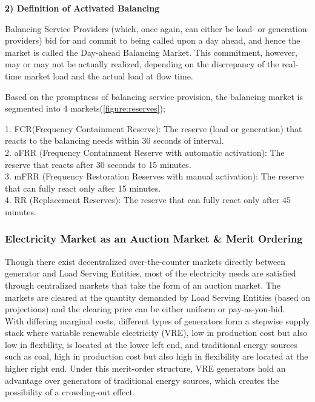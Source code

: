 \documentclass[12pt]{article}
\begin{document}
\begin{appendix}
\textbf{2) Definition of Activated Balancing}\par
Balancing Service Providers (which, once again, can either be load- or generation-providers) bid for and commit to being called upon a day ahead, and hence the market is called the Day-ahead Balancing Market. This commitment, however, may or may not be actually realized, depending on the discrepancy of the real-time market load and the actual load at flow time.\par

Based on the promptness of balancing service provision, the balancing market is segmented into 4 markets(\ref{figure:reserves});\par

1. FCR(Frequency Containment Reserve): The reserve (load or generation) that reacts to the balancing needs within 30 seconds of interval.\\
2. aFRR (Frequency Containment Reserve with automatic activation): The reserve that reacts after 30 seconds to 15 minutes.\\
3. mFRR (Frequency Restoration Reserves with manual activation): The reserve that can fully react only after 15 minutes.\\
4. RR (Replacement Reserves): The reserve that can fully react only after 45 minutes.

\subsubsection*{Electricity Market as an Auction Market \& Merit Ordering}\par
Though there exist decentralized over-the-counter markets directly between generator and Load Serving Entities, most of the electricity needs are satisfied through centralized markets that take the form of an auction market. The markets are cleared at the quantity demanded by Load Serving Entities (based on projections) and the clearing price can be either uniform or pay-as-you-bid.\\
With differing marginal costs, different types of generators form a stepwise supply stack where variable renewable electricity (VRE), low in production cost but also low in flexbility, is located at the lower left end, and traditional energy sources such as coal, high in production cost but also high in flexibility are located at the higher right end. Under this merit-order structure, VRE generators hold an advantage over generators of traditional energy sources, which creates the possibility of a crowding-out effect.


\end{appendix}
\end{document}
